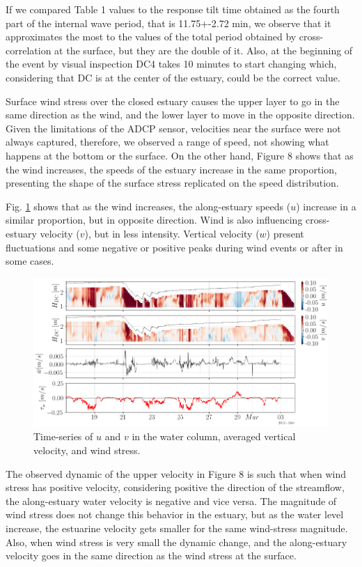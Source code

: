 \documentclass[tesis.tex]{subfiles}
\begin{document}
    If we compared Table 1 values to the response tilt time obtained as the fourth part of the internal wave period, that is 11.75+-2.72 min, we observe that it approximates the most to the values of the total period obtained by cross-correlation at the surface, but they are the double of it. Also, at the beginning of the event by visual inspection DC4 takes 10 minutes to start changing which, considering that DC is at the center of the estuary, could be the correct value.

    Surface wind stress over the closed estuary causes the upper layer to go in the same direction as the wind, and the lower layer to move in the opposite direction. Given the limitations of the ADCP sensor, velocities near the surface were not always captured, therefore, we observed a range of speed, not showing what happens at the bottom or the surface. On the other hand, Figure 8 shows that as the wind increases, the speeds of the estuary increase in the same proportion, presenting the shape of the surface stress replicated on the speed distribution.
    
    Fig. \ref{fig:vels} shows that as the wind increases, the along-estuary speeds ($u$) increase in a similar proportion, but in opposite direction. Wind is also influencing cross-estuary velocity ($v$), but in less intensity. Vertical velocity ($w$) present fluctuations and some negative or positive peaks during wind events or after in some cases. 

    \begin{figure}[h!]
        \centering
        \includegraphics[width=\textwidth]{Imagenes/vels.png}
        \caption{Time-series of $u$ and $v$ in the water column, averaged vertical velocity, and wind stress.}
        \label{fig:vels}
    \end{figure}
    
    The observed dynamic of the upper velocity in Figure 8 is such that when wind stress has positive velocity, considering positive the direction of the streamflow, the along-estuary water velocity is negative and vice versa. The magnitude of wind stress does not change this behavior in the estuary, but as the water level increase, the estuarine velocity gets smaller for the same wind-stress magnitude. Also, when wind stress is very small the dynamic change, and the along-estuary velocity goes in the same direction as the wind stress at the surface. 
    
\end{document}
